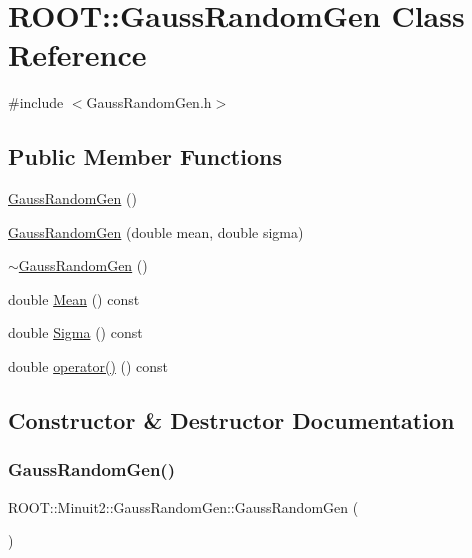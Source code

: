 \hypertarget{classROOT_1_1Minuit2_1_1GaussRandomGen}{}\section{R\+O\+OT\+:\+:Gauss\+Random\+Gen Class Reference}
\label{classROOT_1_1Minuit2_1_1GaussRandomGen}


{\ttfamily \#include $<$Gauss\+Random\+Gen.\+h$>$}

\subsection*{Public Member Functions}
\begin{DoxyCompactItemize}
\item 
\mbox{\hyperlink{classROOT_1_1Minuit2_1_1GaussRandomGen_aa69b55c52b1d75f17b63b8b221a9db15}{Gauss\+Random\+Gen}} ()
\item 
\mbox{\hyperlink{classROOT_1_1Minuit2_1_1GaussRandomGen_afda9ccd9d6e848aadc5596c27f690a10}{Gauss\+Random\+Gen}} (double mean, double sigma)
\item 
\mbox{\hyperlink{classROOT_1_1Minuit2_1_1GaussRandomGen_abcee4b223f80a68384c09bd13c922a03}{$\sim$\+Gauss\+Random\+Gen}} ()
\item 
double \mbox{\hyperlink{classROOT_1_1Minuit2_1_1GaussRandomGen_af0c44fa97654765f21d85891ef141e2d}{Mean}} () const
\item 
double \mbox{\hyperlink{classROOT_1_1Minuit2_1_1GaussRandomGen_a13d1989f3eced64b30a04788f8ed2cad}{Sigma}} () const
\item 
double \mbox{\hyperlink{classROOT_1_1Minuit2_1_1GaussRandomGen_aaefcd8e04b3388314c9f14932a17a163}{operator()}} () const
\end{DoxyCompactItemize}


\subsection{Constructor \& Destructor Documentation}
\mbox{\label{classROOT_1_1Minuit2_1_1GaussRandomGen_aa69b55c52b1d75f17b63b8b221a9db15}} 
\subsubsection{\texorpdfstring{GaussRandomGen()}{GaussRandomGen()}\hspace{0.1cm}{\footnotesize\ttfamily [1/2]}}
{\footnotesize\ttfamily R\+O\+O\+T\+::\+Minuit2\+::\+Gauss\+Random\+Gen\+::\+Gauss\+Random\+Gen (\begin{DoxyParamCaption}{ }\end{DoxyParamCaption})\hspace{0.3cm}{\ttfamily [inline]}}

